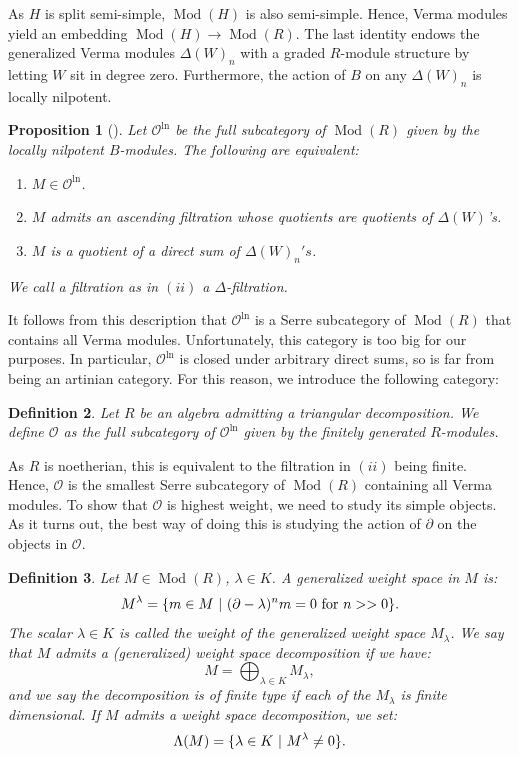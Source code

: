 \documentclass{amsart}
\newtheorem{defi}{ Definition}[subsection]
\newtheorem{prop}[defi]{ Proposition}
\newcommand{\Mod}{\operatorname{Mod}}
\newcommand{\OX}{\mathcal{O}}
\begin{document}
As $H$ is split semi-simple, $\Mod(H)$ is also semi-simple. Hence, Verma modules yield an embedding $\Mod(H)\rightarrow \Mod(R)$. The last identity endows the generalized Verma modules  $\Delta(W)_n$ with a graded $R$-module structure by letting $W$ sit in degree zero. Furthermore, the action of $B$ on any $\Delta(W)_n$ is locally nilpotent. 
\begin{prop}[{\cite[Proposition 2.2]{ginzburg2003category}}]\label{prop description of Oln}
Let $\OX^{\operatorname{ln}}$ be the full subcategory of $\Mod(R)$ given by the locally nilpotent $B$-modules. The following are equivalent:
\begin{enumerate}[label=(\roman*)]
    \item $M\in \OX^{\operatorname{ln}}$.
    \item $M$ admits an ascending filtration whose quotients are quotients of $\Delta(W)$'s.
    \item $M$ is a quotient of a direct sum of $\Delta(W)_n's$.
\end{enumerate}
We call a filtration as in $(ii)$ a $\Delta$-filtration.
\end{prop}
It follows from this description that $\OX^{\operatorname{ln}}$ is a Serre subcategory of $\Mod(R)$ that contains all Verma modules. Unfortunately, this category is too big for our purposes. In particular, $\OX^{\operatorname{ln}}$ is closed under arbitrary direct sums, so is far from being an artinian category. For this reason, we introduce the following category:
\begin{defi}
Let $R$ be an algebra admitting a triangular decomposition. We define $\OX$ as the full subcategory of $\OX^{\operatorname{ln}}$ given by the finitely generated $R$-modules.
\end{defi}
As $R$ is noetherian, this is equivalent to the filtration in $(ii)$ being finite. Hence, $\OX$ is the smallest Serre subcategory of $\Mod(R)$ containing all Verma modules. To show that $\OX$ is highest weight, we need to study its simple objects. As it turns out, the best way of doing this is studying the action of $\partial$ on the objects in $\OX$. 
\begin{defi}\label{defi weight space decomp}
Let $M\in \Mod(R)$, $\lambda \in K$. A generalized weight space in $M$ is:
\begin{equation*}
    M^{\lambda}=\{ m\in M\textnormal{ }\vert \textnormal{ } (\partial-\lambda)^nm=0 \textnormal{ for } n>>0\}.
\end{equation*}
The scalar $\lambda\in K$ is called the weight of the generalized weight space $M_{\lambda}$. We say that $M$ admits a (generalized) weight space decomposition if we have:
\begin{equation*}
    M=\bigoplus_{\lambda\in K}M_{\lambda},
\end{equation*}
and we say the decomposition is of finite type if each of the $M_{\lambda}$ is finite dimensional. If $M$ admits a weight space decomposition, we set:
\begin{equation*}
    \Lambda(M)= \{ \lambda\in K \textnormal{ }\vert \textnormal{ } M^{\lambda}\neq 0 \}.
\end{equation*}
\end{defi}
\end{document}
